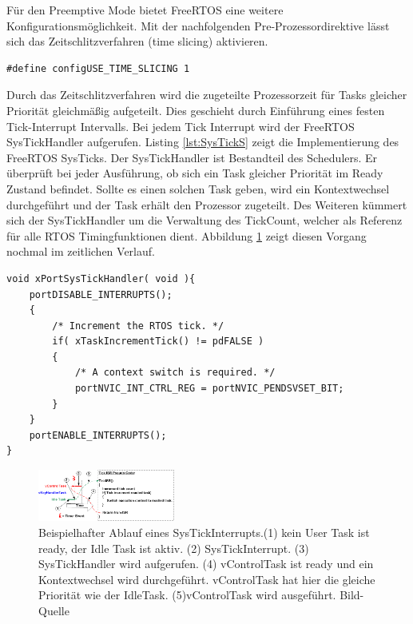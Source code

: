 Für den Preemptive Mode bietet FreeRTOS eine weitere Konfigurationsmöglichkeit. Mit der nachfolgenden Pre-Prozessordirektive lässt sich das Zeitschlitzverfahren (time slicing) aktivieren. 
\begin{lstlisting}[numbers = none]
#define configUSE_TIME_SLICING 1
\end{lstlisting}
Durch das Zeitschlitzverfahren wird die zugeteilte Prozessorzeit für Tasks gleicher Priorität gleichmäßig aufgeteilt. Dies geschieht durch Ein\-füh\-rung eines festen Tick-Interrupt Intervalls. Bei jedem Tick Interrupt wird der FreeRTOS SysTickHandler aufgerufen. Listing \ref{lst:SysTickS} zeigt die Implementierung des FreeRTOS SysTicks. Der SysTickHandler ist Bestandteil des Schedulers. Er überprüft bei jeder Ausführung, ob sich ein Task gleicher Priorität im Ready Zustand befindet. Sollte es einen solchen Task geben, wird ein Kontextwechsel durchgeführt und der Task erhält den Prozessor zugeteilt. Des Weiteren kümmert sich der SysTickHandler um die Verwaltung des TickCount, welcher als Referenz für alle RTOS Timingfunktionen dient. Abbildung \ref{fig:SysTick} zeigt diesen Vorgang nochmal im zeitlichen Verlauf.
\begin{lstlisting}[caption={FreeRTOS Source des SysTickHandlers aus Task.c. Der SysTickHandler verwaltet den TickCount. Der TickCount dient allen Timingfunktionen des RTOS Kernels als Zeitreferenz. Des Weiteren wird beim aktiven Time Slicing überprüft ob ein Kontextwechsel nötig ist. Der Kontextwechsel wird dann ggf. durch den PendSVHandler durchgeführt.}, linewidth=8cm,captionpos=b, label=lst:SysTickS, float=hbt]
void xPortSysTickHandler( void ){
	portDISABLE_INTERRUPTS();
	{
		/* Increment the RTOS tick. */
		if( xTaskIncrementTick() != pdFALSE )
		{
			/* A context switch is required. */
			portNVIC_INT_CTRL_REG = portNVIC_PENDSVSET_BIT;
		}
	}
	portENABLE_INTERRUPTS();
}
\end{lstlisting}
\begin{figure}[htb]
	\centering
		\includegraphics[width=0.4\textwidth]{Pictures/FreeRTOSOrg/TickISR.png}
	\caption{Beispielhafter Ablauf eines SysTickInterrupts.(1) kein User Task ist ready, der Idle Task ist aktiv. (2) SysTickInterrupt. (3) SysTickHandler wird aufgerufen. (4) vControlTask ist ready und ein Kontextwechsel wird durchgeführt. vControlTask hat hier die gleiche Priorität wie der IdleTask. (5)vControlTask wird ausgeführt. Bild-Quelle~\protect{}}
	\label{fig:SysTick}
\end{figure}
